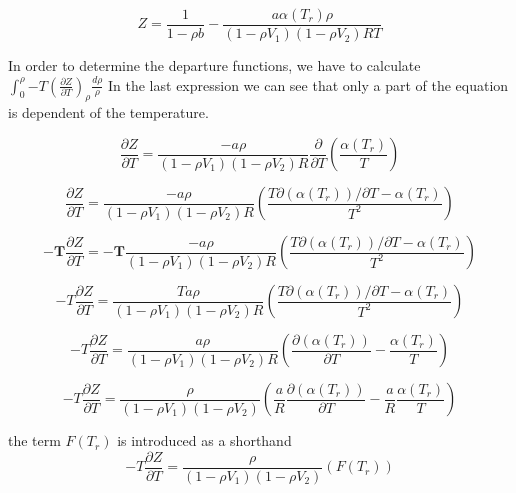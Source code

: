 \documentclass{article}
\begin{document}
\begin{equation*}
    Z = \frac{1}{1-\rho b} - \frac{a\alpha(T_r)\rho}{(1-\rho V_1)(1-\rho V_2)RT}   
\end{equation*}

In order to determine the departure functions, we have to calculate $\int_0^\rho{-T\left(\frac{\partial Z}{\partial T}\right)_\rho}\frac{d\rho}{\rho}$
In the last expression we can see that only a part of the equation is dependent of the temperature.

\begin{equation*}
    \frac{\partial Z}{\partial T} = \frac{-a\rho}{(1-\rho V_1)(1-\rho V_2)R}\frac{\partial}{\partial T}\left(\frac{\alpha(T_r)}{T}\right)
\end{equation*}

\begin{equation*}
    \frac{\partial Z}{\partial T} = \frac{-a\rho}{(1-\rho V_1)(1-\rho V_2)R}\left(\frac{T\partial(\alpha(T_r))/\partial T - \alpha(T_r)}{T^2}\right)
\end{equation*}

\begin{equation*}
    \boldsymbol{-T}\frac{\partial Z}{\partial T} = \boldsymbol{-T}\frac{-a\rho}{(1-\rho V_1)(1-\rho V_2)R}\left(\frac{T\partial(\alpha(T_r))/\partial T - \alpha(T_r)}{T^2}\right)
\end{equation*}

\begin{equation*}
    -T\frac{\partial Z}{\partial T} = \frac{Ta\rho}{(1-\rho V_1)(1-\rho V_2)R}\left(\frac{T\partial(\alpha(T_r))/\partial T - \alpha(T_r)}{T^2}\right)
\end{equation*}

\begin{equation*}
    -T\frac{\partial Z}{\partial T} = \frac{a\rho}{(1-\rho V_1)(1-\rho V_2)R}\left(\frac{\partial(\alpha(T_r))}{\partial T} - \frac{\alpha(T_r)}{T}\right)
\end{equation*}

\begin{equation*}
    -T\frac{\partial Z}{\partial T} = \frac{\rho}{(1-\rho V_1)(1-\rho V_2)}\left(\frac{a}{R}\frac{\partial(\alpha(T_r))}{\partial T} - \frac{a}{R}\frac{\alpha(T_r)}{T}\right)
\end{equation*}

the term $F(T_r)$ is introduced as a shorthand
\begin{equation*}
    -T\frac{\partial Z}{\partial T} = \frac{\rho}{(1-\rho V_1)(1-\rho V_2)}\left(F(T_r)\right)
\end{equation*}
\end{document}
